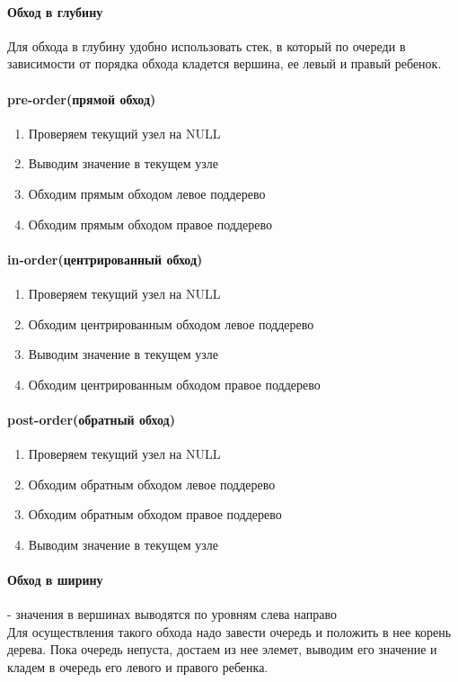 \documentclass[a4paper,10pt]{article}
\begin{document}
\paragraph{Обход в глубину} Для обхода в глубину удобно использовать стек, в который по очереди в зависимости от порядка обхода кладется вершина, ее левый и правый ребенок. 
\paragraph{pre-order(прямой обход)}
\begin{enumerate}
	\item  Проверяем текущий узел на NULL
	\item  Выводим значение в текущем узле
	\item  Обходим прямым обходом левое поддерево
	\item  Обходим прямым обходом правое поддерево
\end{enumerate}

\paragraph{in-order(центрированный обход)}
\begin{enumerate}
	\item  Проверяем текущий узел на NULL
	\item  Обходим центрированным обходом левое поддерево
	\item  Выводим значение в текущем узле
	\item  Обходим центрированным обходом правое поддерево
\end{enumerate}

\paragraph{post-order(обратный обход)}
\begin{enumerate}
	\item  Проверяем текущий узел на NULL
	\item  Обходим обратным обходом левое поддерево
	\item  Обходим обратным обходом правое поддерево
	\item  Выводим значение в текущем узле
\end{enumerate}

\paragraph{Обход в ширину} - значения в вершинах выводятся по уровням слева направо\\
Для осуществления такого обхода надо завести очередь и положить в нее корень дерева. Пока очередь непуста, достаем из нее элемет, выводим его значение и кладем в очередь его левого и правого ребенка.
\end{document}
